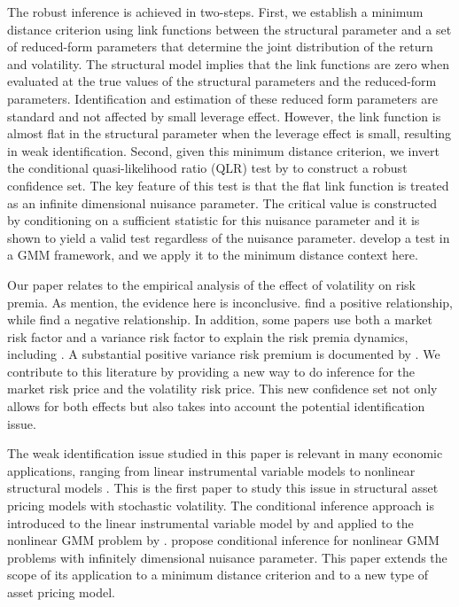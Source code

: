 \documentclass[11pt, letterpaper, twoside]{article}
\begin{document}
The robust inference is achieved in two-steps. First, we establish a minimum distance criterion using link functions between the structural parameter and a set of reduced-form parameters that determine the joint distribution of the return and volatility. The structural model implies that the link functions are zero when evaluated at the true values of the structural parameters and the reduced-form parameters. Identification and estimation of these reduced form parameters are standard and not affected by small leverage effect. However, the link function is almost flat in the structural parameter when the leverage effect is small, resulting in weak identification. Second, given this minimum distance criterion, we invert the conditional quasi-likelihood ratio (QLR) test by \textcite{andrews2016conditional} to construct a robust confidence set. The key feature of this test is that the flat link function is treated as an infinite dimensional nuisance parameter. The critical value is constructed by conditioning on a sufficient statistic for this nuisance parameter and it is shown to yield a valid test regardless of the nuisance parameter. \Textcite{andrews2016conditional} develop a test in a GMM framework, and we apply it to the minimum distance context here.


Our paper relates to the empirical analysis of the effect of volatility on risk premia. As \textcite{lettau2010measuring} mention,  the evidence here is inconclusive. \textcites{bollerslev1988capital, harvey1989timevarying, ghysels2005there, bali2006there, ludvigson2007empirical} find a positive relationship, while \textcites{campbell1987stock, breen1989economic, pagan1991nonparametric, whitelaw1994time, brandt2004relationship} find a negative relationship. In addition, some papers use both a market risk factor and a variance risk factor to explain the risk premia dynamics, including \textcites{christoffersen2013capturing, feunou2014risk, dewbecker2017price}. A substantial positive variance risk premium is documented by \textcites{bollerslev2008risk, drechsler2011whats}. We contribute to this literature by providing a new way to do inference for the market risk price and the volatility risk price. This new confidence set not only allows for both effects but also takes into account the potential identification issue.


The weak identification issue studied in this paper is relevant in many economic applications, ranging from linear instrumental variable models \parencite{staiger1994instrumental} to nonlinear structural models \parencites{mavroeidis2014empirical, andrews2015maximum}. This is the first paper to study this issue in structural asset pricing models with stochastic volatility. The conditional inference approach is introduced to the linear instrumental variable model by \textcite{moreira2003conditional} and applied to the nonlinear GMM problem by \textcite{kleibergen2005testing}. \Textcite{andrews2016conditional} propose conditional inference for nonlinear GMM problems with infinitely dimensional nuisance parameter. This paper extends the scope of its application to a minimum distance criterion and to a new type of asset pricing model.
\end{document}
